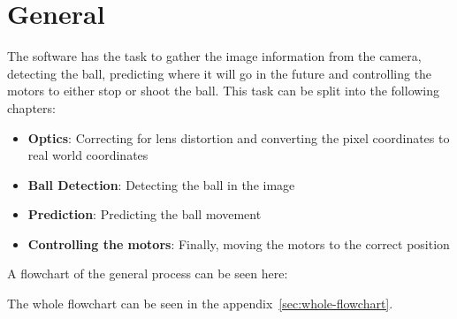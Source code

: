 \section{General}\label{sec:general}
The software has the task to gather the image information from the camera, detecting the ball, predicting where it will go in the future and controlling the motors to either stop or shoot the ball.
This task can be split into the following chapters:
\begin{itemize}
    \item \textbf{Optics}: Correcting for lens distortion and converting the pixel coordinates to real world coordinates
    \item \textbf{Ball Detection}: Detecting the ball in the image
    \item \textbf{Prediction}: Predicting the ball movement
    \item \textbf{Controlling the motors}: Finally, moving the motors to the correct position
\end{itemize}
A flowchart of the general process can be seen here:
%

\begin{center}
\end{center}
The whole flowchart can be seen in the appendix~\ref{sec:whole-flowchart}.


